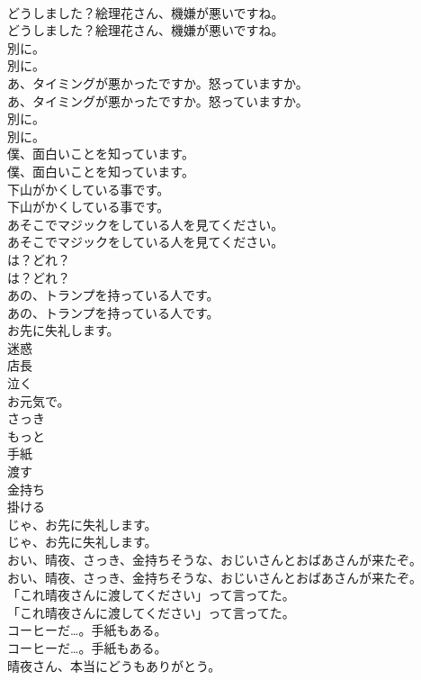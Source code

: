 \documentclass[8pt]{extreport}
\begin{document}
\begin{CJK}{UTF8}{min}
\\	どうしました？絵理花さん、機嫌が悪いですね。	
\\	どうしました？絵理花さん、機嫌が悪いですね。 
\\	別に。	
\\	別に。 
\\	あ、タイミングが悪かったですか。怒っていますか。	
\\	あ、タイミングが悪かったですか。怒っていますか。 
\\	別に。	
\\	別に。 
\\	僕、面白いことを知っています。	
\\	僕、面白いことを知っています。 
\\	下山がかくしている事です。	
\\	下山がかくしている事です。 
\\	あそこでマジックをしている人を見てください。	
\\	あそこでマジックをしている人を見てください。 
\\	は？どれ？	
\\	は？どれ？ 
\\	あの、トランプを持っている人です。	
\\	あの、トランプを持っている人です。 
\\	お先に失礼します。
\\	迷惑
\\	店長
\\	泣く
\\	お元気で。
\\	さっき
\\	もっと
\\	手紙
\\	渡す
\\	金持ち
\\	掛ける
\\	じゃ、お先に失礼します。	
\\	じゃ、お先に失礼します。 
\\	おい、晴夜、さっき、金持ちそうな、おじいさんとおばあさんが来たぞ。	
\\	おい、晴夜、さっき、金持ちそうな、おじいさんとおばあさんが来たぞ。 
\\	「これ晴夜さんに渡してください」って言ってた。	
\\	「これ晴夜さんに渡してください」って言ってた。　 
\\	コーヒーだ…。手紙もある。	
\\	コーヒーだ…。手紙もある。 
\\	晴夜さん、本当にどうもありがとう。	

\end{CJK}
\end{document}
